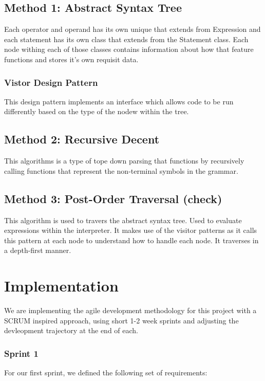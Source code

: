 \documentclass[a4paper, oneside, 11pt]{report}
\begin{document}
\section{Method 1: Abstract Syntax Tree}
Each operator and operand has its own unique that extends from Expression and each statement has its own class that extends from the Statement class. Each node withing each of those classes contains information about how that feature functions and stores it's own requisit data. 
\subsection{Vistor Design Pattern}
This design pattern implements an interface which allows code to be run differently based on the type of the nodew within the tree.

\section{Method 2: Recursive Decent}
This algorithms is a type of tope down parsing that functions by recursively calling functions that represent the non-terminal symbols in the grammar.

\section{Method 3: Post-Order Traversal (check)}
This algorithm is used to travers the abstract syntax tree. Used to evaluate expressions within the interpreter. It makes use of the visitor patterns as it calls this pattern at each node to understand how to handle each node. It traverses in a depth-first manner.



\chapter{Implementation}\label{Impl}

We are implementing the agile development methodology for this project with a SCRUM inspired approach, using short 1-2 week sprints and adjusting the devleopment trajectory at the end of each.

\subsection{Sprint 1}

For our first sprint, we defined the following set of requirements: 
\end{document}
